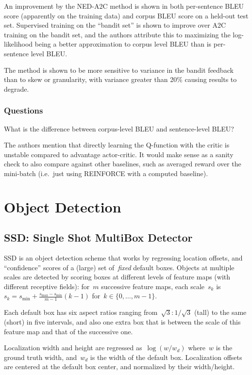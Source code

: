 \documentclass[a4paper, 12pt]{article}
\begin{document}
An improvement by the NED-A2C method is shown in both per-sentence BLEU score
(apparently on the training data) and corpus BLEU score on a held-out test set.
Supervised training on the ``bandit set'' is shown to improve over A2C training
on the bandit set, and the authors attribute this to maximizing the
log-likelihood being a better approximation to corpus level BLEU than is
per-sentence level BLEU\@.

The method is shown to be more sensitive to variance in the bandit feedback
than to skew or granularity, with variance greater than 20\% causing results to
degrade.


\subsubsection{Questions}

What is the difference between corpus-level BLEU and sentence-level BLEU\@?

The authors mention that directly learning the Q-function with the critic is
unstable compared to advantage actor-critic. It would make sense as a sanity
check to also compare against other baselines, such as averaged reward over the
mini-batch (i.e.\ just using REINFORCE with a computed baseline).


\section{Object Detection}


\subsection{SSD\@: Single Shot MultiBox Detector~\cite{liu2016ssd}}

SSD is an object detection scheme that works by regressing location offsets,
and ``confidence'' scores of a (large) set of~\emph{fixed} default boxes.
Objects at multiple scales are detected by scoring boxes at different levels of
feature maps (with different receptive fields): for~$m$ successive feature
maps, each scale~$s_k$
is~$s_k = s_{\textrm{min}} + \frac{s_{\textrm{max}} - s_{\textrm{min}}}{m - 1}(k - 1)$
for~$k \in \{0, \dots, m - 1\}$.

Each default box has six aspect ratios ranging from~$\sqrt{3}:1/\sqrt{3}$
(tall) to the same (short) in five intervals, and also one extra box that is
between the scale of this feature map and that of the successive one.

Localization width and height are regressed as~$\log(w/w_d)$ where~$w$ is the
ground truth width, and~$w_d$ is the width of the default box. Localization
offsets are centered at the default box center, and normalized by their
width/height.
\end{document}
